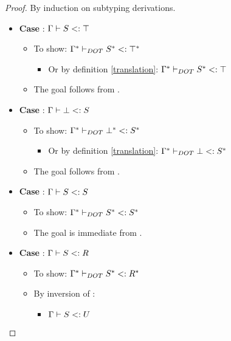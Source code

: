 \begin{proof}
    By induction on subtyping derivations.
    \begin{itemize}
        \item \textbf{Case} : $\Gamma \vdash S <: \top$
        \begin{itemize}
            \item To show: $\Gamma^{*} \vdash_{DOT} S^{*} <: \top^{*}$
            \begin{itemize}
                \item Or by definition \ref{translation}:
                    $\Gamma^{*} \vdash_{DOT} S^{*} <: \top$
            \end{itemize}
            \item The goal follows from .
        \end{itemize}
        \item \textbf{Case} : $\Gamma \vdash \bot <: S$
        \begin{itemize}
            \item To show: $\Gamma^{*} \vdash_{DOT} \bot^{*} <: S^{*}$
            \begin{itemize}
                \item Or by definition \ref{translation}:
                    $\Gamma^{*} \vdash_{DOT} \bot <: S^{*}$
            \end{itemize}
            \item The goal follows from .
        \end{itemize}
        \item \textbf{Case} : $\Gamma \vdash S <: S$
        \begin{itemize}
            \item To show: $\Gamma^{*} \vdash_{DOT} S^{*} <: S^{*}$
            \item The goal is immediate from .
        \end{itemize}
        \item \textbf{Case} : $\Gamma \vdash S <: R$
        \begin{itemize}
            \item To show: $\Gamma^{*} \vdash_{DOT} S^{*} <: R^{*}$
            \item By inversion of :
            \begin{itemize}
                \item $\Gamma \vdash S <: U$
                \begin{itemize}

\end{itemize}
\end{itemize}
\end{itemize}
\end{itemize}
\end{proof}
